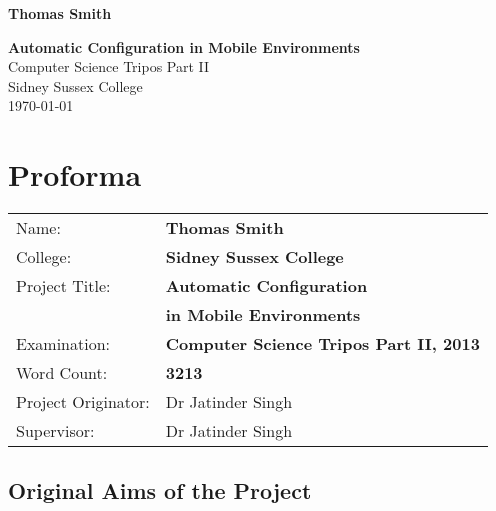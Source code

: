\documentclass[12pt,twoside,notitlepage]{report}
\begin{document}





\pagestyle{empty}

\hfill{\LARGE \bf Thomas Smith}

\vspace*{60mm}
\begin{center}
\Huge
{\bf Automatic Configuration in Mobile Environments} \\
\vspace*{5mm}
Computer Science Tripos Part II \\
\vspace*{5mm}
Sidney Sussex College \\
\vspace*{5mm}
\today  %
\end{center}

\cleardoublepage


\setcounter{page}{1}
\pagestyle{plain}

\chapter*{Proforma}

{\large
\begin{tabular}{ll}
Name:               & \bf Thomas Smith	\\
College:            & \bf Sidney Sussex College	\\
Project Title:      & \bf Automatic Configuration \\ &\bf in Mobile Environments	\\
Examination:        & \bf Computer Science Tripos Part II, 2013 	\\
Word Count:         & \bf 3213\footnotemark[1] \\
Project Originator: & Dr Jatinder Singh		\\
Supervisor:         & Dr Jatinder Singh		\\ 
\end{tabular}
}



\section*{Original Aims of the Project}
\end{document}
